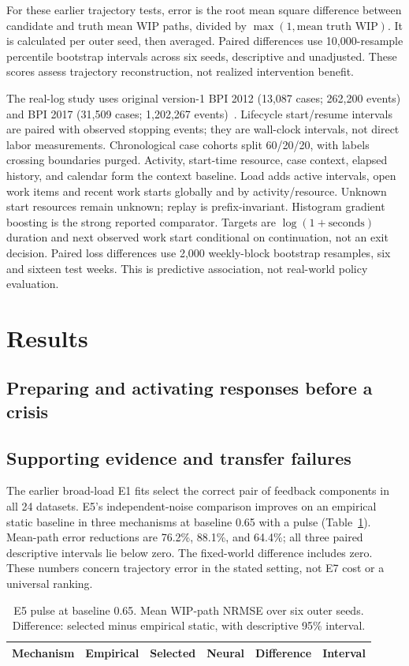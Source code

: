\documentclass[runningheads]{llncs}
\begin{document}
For these earlier trajectory tests, error is the root mean square difference between candidate and truth mean WIP paths, divided by $\max(1,\text{mean truth WIP})$. It is calculated per outer seed, then averaged. Paired differences use 10,000-resample percentile bootstrap intervals across six seeds, descriptive and unadjusted. These scores assess trajectory reconstruction, not realized intervention benefit.

The real-log study uses original version-1 BPI 2012 (13,087 cases; 262,200 events) and BPI 2017 (31,509 cases; 1,202,267 events)~\cite{bpi12,bpi17}. Lifecycle start/resume intervals are paired with observed stopping events; they are wall-clock intervals, not direct labor measurements. Chronological case cohorts split 60/20/20, with labels crossing boundaries purged. Activity, start-time resource, case context, elapsed history, and calendar form the context baseline. Load adds active intervals, open work items and recent work starts globally and by activity/resource. Unknown start resources remain unknown; replay is prefix-invariant. Histogram gradient boosting is the strong reported comparator. Targets are $\log(1+\mathrm{seconds})$ duration and next observed work start conditional on continuation, not an exit decision. Paired loss differences use 2,000 weekly-block bootstrap resamples, six and sixteen test weeks. This is predictive association, not real-world policy evaluation.

\section{Results}
\subsection{Preparing and activating responses before a crisis}


\subsection{Supporting evidence and transfer failures}
The earlier broad-load E1 fits select the correct pair of feedback components in all 24 datasets. E5's independent-noise comparison improves on an empirical static baseline in three mechanisms at baseline 0.65 with a pulse (Table~\ref{tab:e5}). Mean-path error reductions are 76.2\%, 88.1\%, and 64.4\%; all three paired descriptive intervals lie below zero. The fixed-world difference includes zero. These numbers concern trajectory error in the stated setting, not E7 cost or a universal ranking.
\begin{table}[t]
\caption{E5 pulse at baseline 0.65. Mean WIP-path NRMSE over six outer seeds. Difference: selected minus empirical static, with descriptive 95\% interval.}\label{tab:e5}
\centering\small\setlength{\tabcolsep}{4pt}
\begin{tabular}{lrrrrl}\toprule
Mechanism & Empirical & Selected & Neural & Difference & Interval\\\midrule

\end{tabular}
\end{table}
\end{document}
